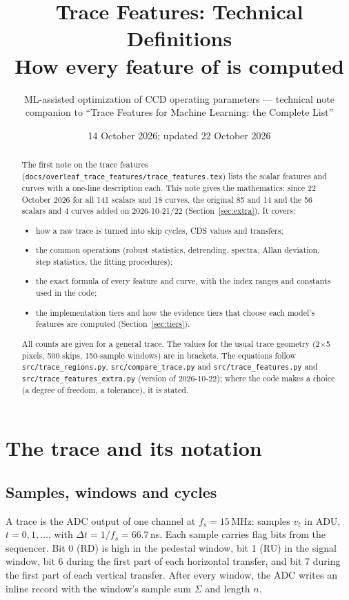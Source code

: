 \documentclass[10pt]{article}
\title{Trace Features: Technical Definitions\\[2pt]
\large How every feature of \code{trace\_features.py} is computed}
\author{ML-assisted optimization of CCD operating parameters --- technical note\\
\small companion to ``Trace Features for Machine Learning: the Complete List''}
\date{14 October 2026; updated 22 October 2026}
\newcommand{\code}[1]{\texttt{#1}}
\begin{document}
\maketitle

\begin{abstract}
The first note on the trace features (\code{docs/overleaf\_trace\_features/trace\_features.tex}) lists the scalar features and curves with a one-line
description each. This note gives the mathematics: since 22 October 2026 for all 141 scalars and 18 curves, the original 85 and 14 and
the 56 scalars and 4 curves added on 2026-10-21/22 (Section~\ref{sec:extra}). It covers:
\begin{itemize}
\item how a raw trace is turned into skip cycles, CDS values and transfers;
\item the common operations (robust statistics, detrending, spectra, Allan deviation, step statistics, the fitting procedures);
\item the exact formula of every feature and curve, with the index ranges and constants used in the code;
\item the implementation tiers and how the evidence tiers that choose each model's features are computed (Section~\ref{sec:tiers}).
\end{itemize}
All counts are given for a general trace. The values for the usual trace geometry (2$\times$5 pixels, 500 skips,
150-sample windows) are in brackets. The equations follow \code{src/trace\_regions.py}, \code{src/compare\_trace.py} and
\code{src/trace\_features.py} and \code{src/trace\_features\_extra.py} (version of 2026-10-22); where the code makes a choice (a degree of freedom, a tolerance), it is
stated.
\end{abstract}

\tableofcontents

\section{The trace and its notation}

\subsection{Samples, windows and cycles}
A trace is the ADC output of one channel at $f_s = 15$\,MHz: samples $v_t$ in ADU, $t = 0, 1, \dots$, with
$\Delta t = 1/f_s = 66.7$\,ns. Each sample carries flag bits from the sequencer. Bit 0 (RD) is high in the pedestal window, bit 1
(RU) in the signal window, bit 6 during the first part of each horizontal transfer, and bit 7 during the first part of each
vertical transfer. After every window, the ADC writes an inline record with the window's sample sum $\Sigma$ and length $n$.
\end{document}

